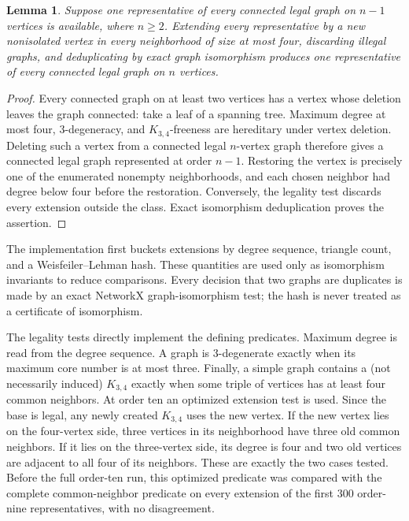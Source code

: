 \documentclass[11pt]{article}
\newtheorem{lemma}[theorem]{Lemma}
\begin{document}
\begin{lemma}\label{lem:generation}
Suppose one representative of every connected legal graph on $n-1$ vertices
is available, where $n\geq 2$.  Extending every representative by a new
nonisolated vertex in every neighborhood of size at most four, discarding
illegal graphs, and deduplicating by exact graph isomorphism produces one
representative of every connected legal graph on $n$ vertices.
\end{lemma}

\begin{proof}
Every connected graph on at least two vertices has a vertex whose deletion
leaves the graph connected: take a leaf of a spanning tree.  Maximum degree
at most four, $3$-degeneracy, and $K_{3,4}$-freeness are hereditary under
vertex deletion.  Deleting such a vertex from a connected legal $n$-vertex
graph therefore gives a connected legal graph represented at order $n-1$.
Restoring the vertex is precisely one of the enumerated nonempty
neighborhoods, and each chosen neighbor had degree below four before the
restoration.  Conversely, the legality test discards every extension outside
the class.  Exact isomorphism deduplication proves the assertion.
\end{proof}

The implementation first buckets extensions by degree sequence, triangle
count, and a Weisfeiler--Lehman hash.  These quantities are used only as
isomorphism invariants to reduce comparisons.  Every decision that two graphs
are duplicates is made by an exact NetworkX graph-isomorphism test; the hash
is never treated as a certificate of isomorphism.

The legality tests directly implement the defining predicates.  Maximum
degree is read from the degree sequence.  A graph is $3$-degenerate exactly
when its maximum core number is at most three.  Finally, a simple graph
contains a (not necessarily induced) $K_{3,4}$ exactly when some triple of
vertices has at least four common neighbors.  At order ten an optimized
extension test is used.  Since the base is legal, any newly created
$K_{3,4}$ uses the new vertex.  If the new vertex lies on the four-vertex
side, three vertices in its neighborhood have three old common neighbors.  If
it lies on the three-vertex side, its degree is four and two old vertices are
adjacent to all four of its neighbors.  These are exactly the two cases
tested.  Before the full order-ten run, this optimized predicate was compared
with the complete common-neighbor predicate on every extension of the first
$300$ order-nine representatives, with no disagreement.
\end{document}
